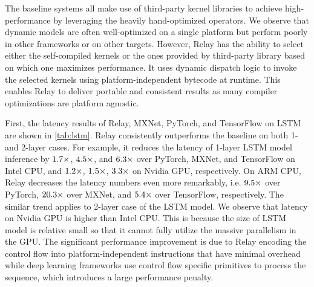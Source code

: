     The baseline systems all make use of third-party kernel libraries to achieve high-performance by leveraging the heavily hand-optimized operators. We observe that dynamic models are often well-optimized on a single platform but perform poorly in other frameworks or on other targets. However, Relay has the ability to select either the self-compiled kernels or the ones provided by third-party library based on which one maximizes performance. It uses dynamic dispatch logic to invoke the selected kernels using platform-independent bytecode at runtime. This enables Relay to deliver portable and consistent results as many compiler optimizations are platform agnostic.

    First, the latency results of Relay, MXNet, PyTorch, and TensorFlow on LSTM are shown in \autoref{tab:lstm}. Relay consistently outperforms the baseline on both 1- and 2-layer cases. For example, it reduces the latency of 1-layer LSTM model inference by $\fpeval{round(79.3 / 47.8, 1)}\times$, $\fpeval{round(212.9 / 47.8, 1)}\times$, and $\fpeval{round(301.4 / 47.8, 1)}\times$ over PyTorch, MXNet, and TensorFlow on Intel CPU,
    and $\fpeval{round(110.3/93.0, 1)}\times$, $\fpeval{round(135.7/93.0, 1)}\times$, $\fpeval{round(304.7/93.0, 1)}\times$ on Nvidia GPU, respectively.
    On ARM CPU, Relay decreases the latency numbers even more remarkably, i.e. $\fpeval{round(1729.5 / 182.2, 1)}\times$ over PyTorch, $\fpeval{round(3695.9 / 182.2, 1)}\times$ over MXNet, and $\fpeval{round(978.3 / 182.2, 1)}\times$ over TensorFlow, respectively.
    The similar trend applies to 2-layer case of the LSTM model.
    We observe that latency on Nvidia GPU is higher than Intel CPU. This is because the size of LSTM model is relative small so that it cannot fully utilize the massive parallelism in the GPU.
    The significant performance improvement is due to Relay encoding the control flow into platform-independent instructions that have minimal overhead while deep learning frameworks use control flow specific primitives to process the sequence, which introduces a large performance penalty.

